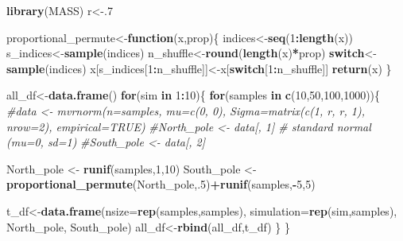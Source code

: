 \documentclass[
]{book}
\newenvironment{Shaded}{\begin{snugshade}}{\end{snugshade}}
\newcommand{\CommentTok}[1]{\textcolor[rgb]{0.56,0.35,0.01}{\textit{#1}}}
\newcommand{\ControlFlowTok}[1]{\textcolor[rgb]{0.13,0.29,0.53}{\textbf{#1}}}
\newcommand{\DataTypeTok}[1]{\textcolor[rgb]{0.13,0.29,0.53}{#1}}
\newcommand{\DecValTok}[1]{\textcolor[rgb]{0.00,0.00,0.81}{#1}}
\newcommand{\KeywordTok}[1]{\textcolor[rgb]{0.13,0.29,0.53}{\textbf{#1}}}
\newcommand{\NormalTok}[1]{#1}
\newcommand{\OperatorTok}[1]{\textcolor[rgb]{0.81,0.36,0.00}{\textbf{#1}}}
\newcommand{\StringTok}[1]{\textcolor[rgb]{0.31,0.60,0.02}{#1}}
\begin{document}
\begin{Shaded}
\begin{Highlighting}[]
\KeywordTok{library}\NormalTok{(MASS)}
\NormalTok{r<-.}\DecValTok{7}

\NormalTok{proportional_permute<-}\ControlFlowTok{function}\NormalTok{(x,prop)\{}
\NormalTok{  indices<-}\KeywordTok{seq}\NormalTok{(}\DecValTok{1}\OperatorTok{:}\KeywordTok{length}\NormalTok{(x))}
\NormalTok{  s_indices<-}\KeywordTok{sample}\NormalTok{(indices)}
\NormalTok{  n_shuffle<-}\KeywordTok{round}\NormalTok{(}\KeywordTok{length}\NormalTok{(x)}\OperatorTok{*}\NormalTok{prop)}
  \ControlFlowTok{switch}\NormalTok{<-}\KeywordTok{sample}\NormalTok{(indices)}
\NormalTok{  x[s_indices[}\DecValTok{1}\OperatorTok{:}\NormalTok{n_shuffle]]<-x[}\ControlFlowTok{switch}\NormalTok{[}\DecValTok{1}\OperatorTok{:}\NormalTok{n_shuffle]]}
  \KeywordTok{return}\NormalTok{(x)}
\NormalTok{\}}

\NormalTok{all_df<-}\KeywordTok{data.frame}\NormalTok{()}
\ControlFlowTok{for}\NormalTok{(sim }\ControlFlowTok{in} \DecValTok{1}\OperatorTok{:}\DecValTok{10}\NormalTok{)\{}
  \ControlFlowTok{for}\NormalTok{(samples }\ControlFlowTok{in} \KeywordTok{c}\NormalTok{(}\DecValTok{10}\NormalTok{,}\DecValTok{50}\NormalTok{,}\DecValTok{100}\NormalTok{,}\DecValTok{1000}\NormalTok{))\{}
    \CommentTok{#data <- mvrnorm(n=samples, mu=c(0, 0), Sigma=matrix(c(1, r, r, 1), nrow=2), empirical=TRUE)}
    \CommentTok{#North_pole <- data[, 1]  # standard normal (mu=0, sd=1)}
    \CommentTok{#South_pole <- data[, 2] }
    
\NormalTok{    North_pole <-}\StringTok{ }\KeywordTok{runif}\NormalTok{(samples,}\DecValTok{1}\NormalTok{,}\DecValTok{10}\NormalTok{)}
\NormalTok{    South_pole <-}\StringTok{ }\KeywordTok{proportional_permute}\NormalTok{(North_pole,.}\DecValTok{5}\NormalTok{)}\OperatorTok{+}\KeywordTok{runif}\NormalTok{(samples,}\OperatorTok{-}\DecValTok{5}\NormalTok{,}\DecValTok{5}\NormalTok{)}

\NormalTok{    t_df<-}\KeywordTok{data.frame}\NormalTok{(}\DataTypeTok{nsize=}\KeywordTok{rep}\NormalTok{(samples,samples),}
                   \DataTypeTok{simulation=}\KeywordTok{rep}\NormalTok{(sim,samples),}
\NormalTok{                                  North_pole,}
\NormalTok{                                  South_pole)}
\NormalTok{  all_df<-}\KeywordTok{rbind}\NormalTok{(all_df,t_df)}
\NormalTok{  \}}
\NormalTok{\}}


\end{Highlighting}
\end{Shaded}
\end{document}
